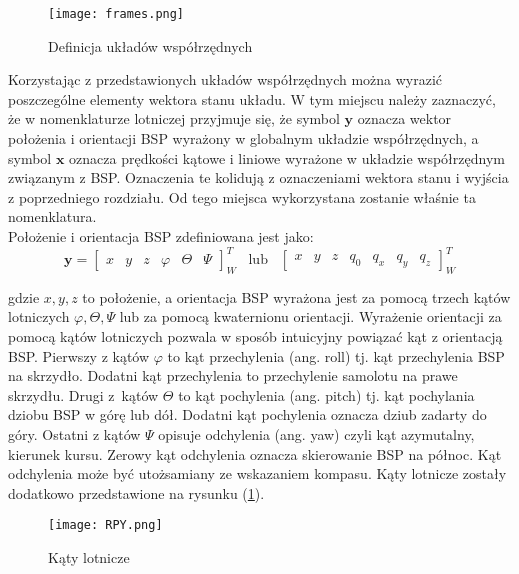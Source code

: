 \begin{figure}[!h]
   	\centering
      	\texttt{[image: frames.png]}
      	\caption{Definicja układów współrzędnych}
\end{figure}

Korzystając z przedstawionych układów współrzędnych można wyrazić poszczególne elementy wektora stanu układu. W tym miejscu należy zaznaczyć, że w nomenklaturze lotniczej przyjmuje się, że symbol $\bm{y}$ oznacza wektor położenia i orientacji BSP wyrażony w globalnym układzie współrzędnych, a symbol $\bm{x}$ oznacza prędkości kątowe i liniowe wyrażone w układzie współrzędnym związanym z BSP. Oznaczenia te kolidują z oznaczeniami wektora stanu i wyjścia z poprzedniego rozdziału. Od tego miejsca wykorzystana zostanie właśnie ta nomenklatura.\\

Położenie i orientacja BSP zdefiniowana jest jako:
\[
	      		 \bm{y} = \begin{bmatrix}x & y &  z & \varphi & \Theta & \Psi  \end{bmatrix}^{T}_{W} \hspace{10pt} \text{lub} \hspace{10pt} \begin{bmatrix}x & y & z & q_0 &  q_x &  q_y & q_z  \end{bmatrix}^{T}_{W}
\]

gdzie $x, y, z$ to położenie, a orientacja BSP wyrażona jest za pomocą trzech kątów lotniczych $\varphi, \Theta,  \Psi$ lub za pomocą kwaternionu orientacji. Wyrażenie orientacji za pomocą kątów lotniczych pozwala w sposób intuicyjny powiązać kąt z orientacją BSP. Pierwszy z kątów $\varphi$ to kąt przechylenia (ang. roll) tj. kąt przechylenia BSP na skrzydło. Dodatni kąt przechylenia to przechylenie samolotu na prawe skrzydłu. Drugi z~kątów $\Theta$ to kąt pochylenia (ang. pitch) tj. kąt pochylania dziobu BSP w górę lub dół. Dodatni kąt pochylenia oznacza dziub zadarty do góry. Ostatni z kątów $\Psi$ opisuje odchylenia (ang. yaw) czyli kąt azymutalny, kierunek kursu. Zerowy kąt odchylenia oznacza skierowanie BSP na północ. Kąt odchylenia może być utożsamiany ze wskazaniem kompasu. Kąty lotnicze zostały dodatkowo przedstawione na rysunku (\ref{RPY}).

\begin{figure}[!h]
   	\centering
      	\texttt{[image: RPY.png]}
      	\caption{Kąty lotnicze}
      	\label{RPY}
\end{figure}

